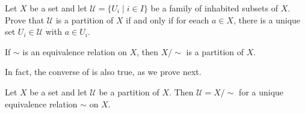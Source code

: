 \begin{exercise}
\label{exConditionsForPartition}
Let $X$ be a set and let $\mathcal{U} = \{ U_i \mid i \in I \}$ be a family of inhabited subsets of $X$. Prove that $\mathcal{U}$ is a partition of $X$ if and only if for eeach $a \in X$, there is a unique set $U_i \in \mathcal{U}$ with $a \in U_i$.
\end{exercise}

\begin{exercise}
\label{exQuotientIsPartition}
If $\sim$ is an equivalence relation on $X$, then $X/{\sim}$ is a partition of $X$.
\end{exercise}

In fact, the converse of  is also true, as we prove next.

\begin{proposition}
\label{propPartitionIsQuotientByEquivalenceRelation}
Let $X$ be a set and let $\mathcal{U}$ be a partition of $X$. Then $\mathcal{U}=X/{\sim}$ for a unique equivalence relation $\sim$ on $X$.
\end{proposition}

